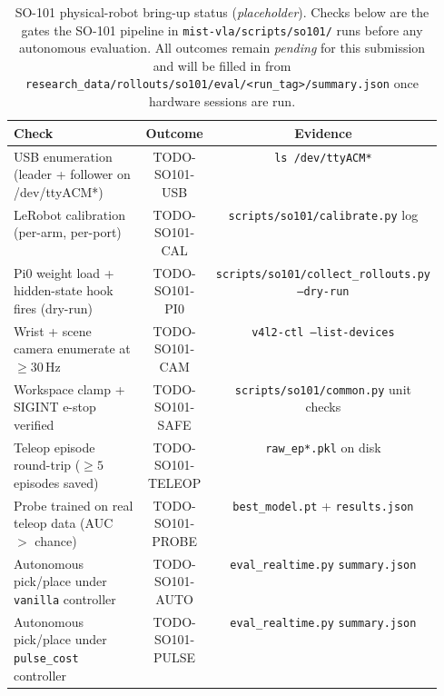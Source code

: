 \begin{table}[t]
\centering
\caption{SO-101 physical-robot bring-up status (\emph{placeholder}). Checks below are the gates the SO-101 pipeline in \texttt{mist-vla/scripts/so101/} runs before any autonomous evaluation. All outcomes remain \emph{pending} for this submission and will be filled in from \texttt{research\_data/rollouts/so101/eval/<run\_tag>/summary.json} once hardware sessions are run.}
\label{tab:so101_bringup_status}
\begin{tabular}{p{0.55\linewidth}cc}
\toprule
Check & Outcome & Evidence \\
\midrule
USB enumeration (leader + follower on /dev/ttyACM*) & TODO-SO101-USB & \texttt{ls /dev/ttyACM*} \\
LeRobot calibration (per-arm, per-port) & TODO-SO101-CAL & \texttt{scripts/so101/calibrate.py} log \\
Pi0 weight load + hidden-state hook fires (dry-run) & TODO-SO101-PI0 & \texttt{scripts/so101/collect\_rollouts.py --dry-run} \\
Wrist + scene camera enumerate at $\geq 30$\,Hz & TODO-SO101-CAM & \texttt{v4l2-ctl --list-devices} \\
Workspace clamp + SIGINT e-stop verified & TODO-SO101-SAFE & \texttt{scripts/so101/common.py} unit checks \\
Teleop episode round-trip ($\geq 5$ episodes saved) & TODO-SO101-TELEOP & \texttt{raw\_ep*.pkl} on disk \\
Probe trained on real teleop data (AUC $> $ chance) & TODO-SO101-PROBE & \texttt{best\_model.pt} + \texttt{results.json} \\
Autonomous pick/place under \texttt{vanilla} controller & TODO-SO101-AUTO & \texttt{eval\_realtime.py} \texttt{summary.json} \\
Autonomous pick/place under \texttt{pulse\_cost} controller & TODO-SO101-PULSE & \texttt{eval\_realtime.py} \texttt{summary.json} \\
\bottomrule
\end{tabular}
\end{table}
